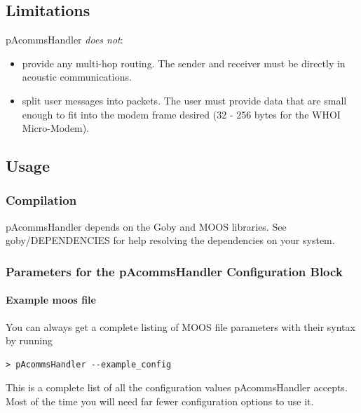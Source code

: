\documentclass[11pt, letterpaper, oneside]{memoir}
\begin{document}
\subsection{Limitations}
pAcommsHandler \textit{does not}:

\begin{itemize}
\item provide any multi-hop routing. The sender and receiver must be directly in acoustic communications.
\item split user messages into packets. The user must provide data that are small enough to fit into the modem frame desired (32 - 256 bytes for the WHOI Micro-Modem).
\end{itemize} 

\subsection{Usage}
\subsubsection{Compilation}
pAcommsHandler depends on the Goby and MOOS libraries. See goby/DEPENDENCIES for help resolving the dependencies on your system.

\subsubsection{Parameters for the pAcommsHandler Configuration Block}\label{sec:pAcommsHandler:config}

\paragraph{Example moos file}

You can always get a complete listing of MOOS file parameters with their syntax by running
\begin{verbatim}
> pAcommsHandler --example_config
\end{verbatim}
\resetbvlinenumber

This is a complete list of all the configuration values pAcommsHandler accepts. Most of the time you will need far fewer configuration options to use it.
\end{document}
